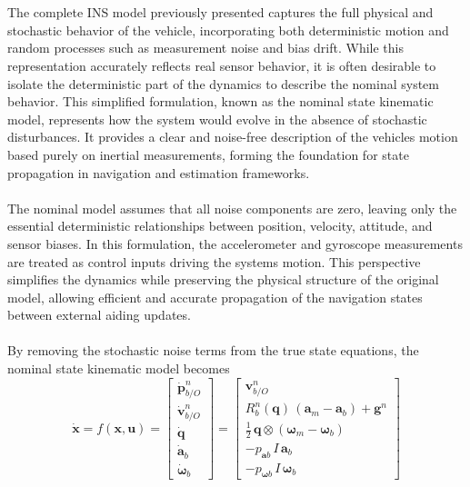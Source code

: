 \\ \\
The complete INS model previously presented captures the full physical and stochastic behavior of the vehicle, incorporating both deterministic motion and random processes such as measurement noise and bias drift. While this representation accurately reflects real sensor behavior, it is often desirable to isolate the deterministic part of the dynamics to describe the nominal system behavior. This simplified formulation, known as the nominal state kinematic model, represents how the system would evolve in the absence of stochastic disturbances. It provides a clear and noise-free description of the vehicles motion based purely on inertial measurements, forming the foundation for state propagation in navigation and estimation frameworks.  
\\ \\
The nominal model assumes that all noise components are zero, leaving only the essential deterministic relationships between position, velocity, attitude, and sensor biases. In this formulation, the accelerometer and gyroscope measurements are treated as control inputs driving the systems motion. This perspective simplifies the dynamics while preserving the physical structure of the original model, allowing efficient and accurate propagation of the navigation states between external aiding updates.  
\\ \\
By removing the stochastic noise terms from the true state equations, the nominal state kinematic model becomes
$$
    \dot{\mathbf{x}} = f(\mathbf{x}, \mathbf{u}) =
    \begin{bmatrix}
        \dot{\mathbf{p}}_{b/O}^{n} \\
        \dot{\mathbf{v}}_{b/O}^{n} \\
        \dot{\mathbf{q}} \\
        \dot{\mathbf{a}}_b \\
        \dot{\mathbf{\omega}}_b
    \end{bmatrix}
    =
    \begin{bmatrix}
        \mathbf{v}_{b/O}^{n} \\
        R_b^n(\mathbf{q})\,(\mathbf{a}_m - \mathbf{a}_{b}) + \mathbf{g}^n \\
        \tfrac{1}{2}\,\mathbf{q} \otimes (\boldsymbol{\omega}_m - \mathbf{\omega}_{b}) \\
        -p_{\mathbf{a}b}\,I\,\mathbf{a}_b \\
        -p_{\mathbf{\omega}b}\,I\,\mathbf{\omega}_b
    \end{bmatrix}
$$
